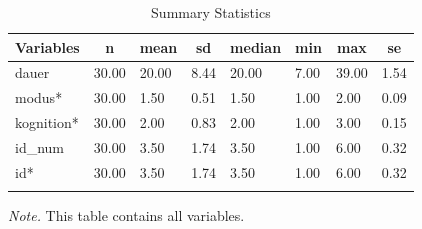 \documentclass[
  doc,floatsintext]{apa6}
\begin{document}
\begin{table}[tbp]
\begin{center}
\begin{threeparttable}
\end{threeparttable}
\end{center}

\end{table}

\begin{table}[tbp]

\begin{center}
\begin{threeparttable}

\caption{\label{tab:tabsumstat}Summary Statistics}

\begin{tabular}{llllllll}
\toprule
Variables & \multicolumn{1}{c}{n} & \multicolumn{1}{c}{mean} & \multicolumn{1}{c}{sd} & \multicolumn{1}{c}{median} & \multicolumn{1}{c}{min} & \multicolumn{1}{c}{max} & \multicolumn{1}{c}{se}\\
\midrule
dauer & 30.00 & 20.00 & 8.44 & 20.00 & 7.00 & 39.00 & 1.54\\
modus* & 30.00 & 1.50 & 0.51 & 1.50 & 1.00 & 2.00 & 0.09\\
kognition* & 30.00 & 2.00 & 0.83 & 2.00 & 1.00 & 3.00 & 0.15\\
id\_num & 30.00 & 3.50 & 1.74 & 3.50 & 1.00 & 6.00 & 0.32\\
id* & 30.00 & 3.50 & 1.74 & 3.50 & 1.00 & 6.00 & 0.32\\
\bottomrule
\addlinespace
\end{tabular}

\begin{tablenotes}[para]
\normalsize{\textit{Note.} This table contains all variables.}
\end{tablenotes}

\end{threeparttable}
\end{center}

\end{table}
\end{document}
